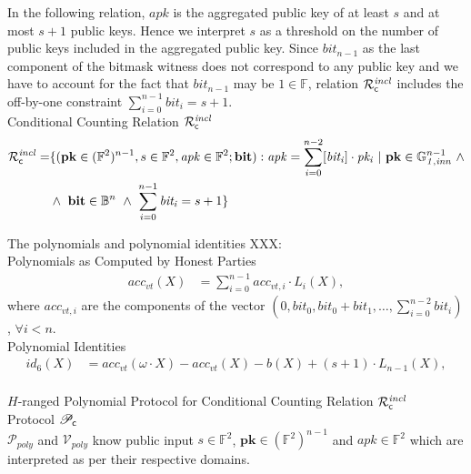 \noindent In the following relation, $\mathit{apk}$ is the aggregated public key of at least $s$ and at most $s+1$ public keys. 
Hence we interpret $s$ as a threshold on the number of public keys included in the aggregated public key. Since $\mathit{bit_{n-1}}$ as the last component of the 
bitmask witness does not correspond to any public key and we have to account for the fact that $\mathit{bit_{n-1}}$ may be 
$1 \in \mathbb{F}$, relation $\mathcal{R}^{\mathit{incl}}_{\mathsf{c}}$ includes the off-by-one constraint $\sum_{i=0}^{n-1} \mathit{bit_i} = s+1$.\\

\noindent \textsf{Conditional Counting Relation $\mathcal{R}^{\mathit{incl}}_{\mathsf{c}}$}  
\begin{equation*}
\begin{split}
 \Rvt = & \{(\mathbf{pk} \in (\mathbb{F}^2)^{n-1}, s \in \mathbb{F}^2, \mathit{apk} \in \mathbb{F}^2; \mathbf{bit}) : 
 \mathit{apk} = \sum_{i=0}^{n-2} [\mathit{bit_i}]  \cdot \mathit{pk_i} \ | \ \mathbf{pk}  \in \ginn{1}^{n-1} \ \wedge \\ 
& \wedge \ \mathbf{bit} \in \mathbb{B}^n \ \wedge \ \sum_{i=0}^{n-1} \mathit{bit_i} = s+1\} 
\end{split}
\end{equation*}

\noindent The polynomials and polynomial identities XXX: \\

\noindent \textsf{Polynomials as Computed by Honest Parties} 
\begin{align*}
acc_{vt}(X) & = \sum_{i=0}^{n-1} acc_{vt,i} \cdot L_i(X),
\end{align*}
where $acc_{vt,i}$ are the components of the vector $(0, \mathit{bit_0}, \mathit{bit_0} + \mathit{bit_1}, \ldots, \sum_{i=0}^{n-2}\mathit{bit_i})$, $\forall i < n$. \\

\noindent \textsf{Polynomial Identities} 
\begin{align*}
id_6(X) & = acc_{vt}(\omega \cdot X) - acc_{vt}(X) - b(X) + (s+1) \cdot L_{n-1}(X),   \\
\end{align*}

\noindent \textsf{{$H$-ranged Polynomial Protocol for Conditional Counting Relation $\mathcal{R}^{\mathit{incl}}_{\mathsf{c}}$}} \\

\noindent \textsf{Protocol $\mathscr{P}_{\mathsf{c}}$} \\

\noindent $\mathcal{P}_{poly}$ and $\mathcal{V}_{poly}$ know public input $s \in \mathbb{F}^2$, 
$\mathbf{pk} \in (\mathbb{F}^2)^{n-1}$ and $\mathit{apk} \in \mathbb{F}^2$ which are interpreted as per their respective domains. 

